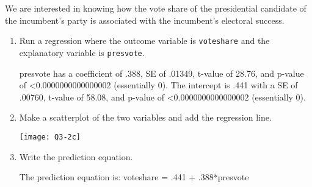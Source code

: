\documentclass[12pt,letterpaper]{article}
\begin{document}
\noindent We are interested in knowing how the vote share of the presidential candidate of the incumbent's party is associated with the incumbent's electoral success.
	\vspace{.25cm}
	\begin{enumerate}
		\item Run a regression where the outcome variable is \texttt{voteshare} and the explanatory variable is \texttt{presvote}.
			\vspace{.5cm}
				
			\vspace{.25cm}
presvote has a coefficient of .388, SE of .01349, t-value of 28.76, and p-value of \textless0.0000000000000002 (essentially 0).
The intercept is .441 with a SE of .00760, t-value of 58.08, and p-value of \textless0.0000000000000002 (essentially 0).
			\vspace{1cm}
		\item Make a scatterplot of the two variables and add the regression line. 
			\vspace{.5cm}
	
			\vspace{.25cm}
\texttt{[image: Q3-2c]}				
			\vspace{1cm}
		\item Write the prediction equation.
			\vspace{.5cm}
	
			\vspace{.25cm}
The prediction equation is: voteshare = .441 + .388*presvote
			\vspace{1cm}
	\end{enumerate}
	

\newpage	
\end{document}
